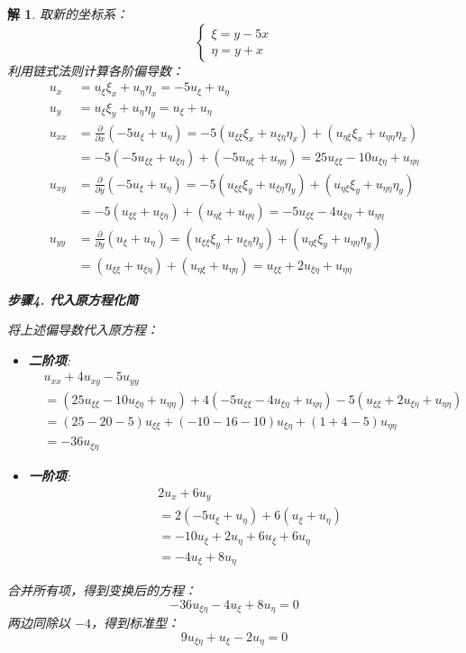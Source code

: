 \documentclass[12pt,a4paper]{article}
\newtheorem*{solution}{解}
\begin{document}
\begin{solution}
		\noindent
		取新的坐标系：
		\[
		\begin{cases}
			\xi = y - 5x \\
			\eta = y + x
		\end{cases}
		\]
		利用链式法则计算各阶偏导数：
		\begin{align*}
			u_x &= u_\xi \xi_x + u_\eta \eta_x = -5u_\xi + u_\eta \\[6pt]
			u_y &= u_\xi \xi_y + u_\eta \eta_y = u_\xi + u_\eta \\[6pt]
			u_{xx} &= \frac{\partial}{\partial x}(-5u_\xi + u_\eta) = -5(u_{\xi\xi}\xi_x + u_{\xi\eta}\eta_x) + (u_{\eta\xi}\xi_x + u_{\eta\eta}\eta_x) \\[6pt]
			&= -5(-5u_{\xi\xi} + u_{\xi\eta}) + (-5u_{\eta\xi} + u_{\eta\eta}) = 25u_{\xi\xi} - 10u_{\xi\eta} + u_{\eta\eta} \\[6pt]
			u_{xy} &= \frac{\partial}{\partial y}(-5u_\xi + u_\eta) = -5(u_{\xi\xi}\xi_y + u_{\xi\eta}\eta_y) + (u_{\eta\xi}\xi_y + u_{\eta\eta}\eta_y) \\[6pt]
			&= -5(u_{\xi\xi} + u_{\xi\eta}) + (u_{\eta\xi} + u_{\eta\eta}) = -5u_{\xi\xi} - 4u_{\xi\eta} + u_{\eta\eta} \\[6pt]
			u_{yy} &= \frac{\partial}{\partial y}(u_\xi + u_\eta) = (u_{\xi\xi}\xi_y + u_{\xi\eta}\eta_y) + (u_{\eta\xi}\xi_y + u_{\eta\eta}\eta_y) \\[6pt]
			&= (u_{\xi\xi} + u_{\xi\eta}) + (u_{\eta\xi} + u_{\eta\eta}) = u_{\xi\xi} + 2u_{\xi\eta} + u_{\eta\eta}
		\end{align*}
		
		\hrulefill
		
		\textbf{步骤4. 代入原方程化简}
		
		\noindent
		将上述偏导数代入原方程：
		\begin{itemize}
			\item \textbf{二阶项}:
			\begin{align*}
				& u_{xx} + 4u_{xy} - 5u_{yy} \\[6pt]
				&= (25u_{\xi\xi} - 10u_{\xi\eta} + u_{\eta\eta}) + 4(-5u_{\xi\xi} - 4u_{\xi\eta} + u_{\eta\eta}) - 5(u_{\xi\xi} + 2u_{\xi\eta} + u_{\eta\eta}) \\[6pt]
				&= (25 - 20 - 5)u_{\xi\xi} + (-10 - 16 - 10)u_{\xi\eta} + (1 + 4 - 5)u_{\eta\eta} \\[6pt]
				&= -36u_{\xi\eta}
			\end{align*}
			\item \textbf{一阶项}:
			\begin{align*}
				& 2u_x + 6u_y \\[6pt]
				&= 2(-5u_\xi + u_\eta) + 6(u_\xi + u_\eta) \\[6pt]
				&= -10u_\xi + 2u_\eta + 6u_\xi + 6u_\eta \\[6pt]
				&= -4u_\xi + 8u_\eta
			\end{align*}
		\end{itemize}
		合并所有项，得到变换后的方程：
		\[
		-36u_{\xi\eta} - 4u_\xi + 8u_\eta = 0
		\]
		两边同除以 $-4$，得到标准型：
		\[
		9u_{\xi\eta} + u_\xi - 2u_\eta = 0
		\]
	\end{solution}
	
\end{document}
